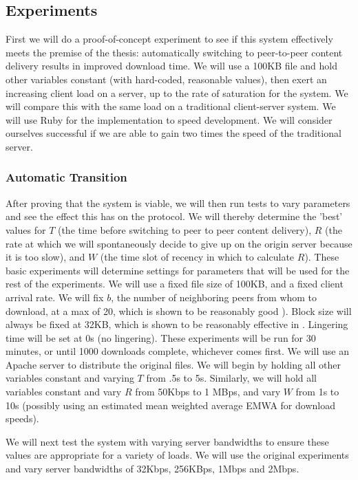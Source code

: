 \subsection{Experiments}
First we will do a proof-of-concept experiment to see if this system effectively meets the premise of the thesis: automatically switching to peer-to-peer content delivery results in improved download time.  We will use a 100KB file and hold other variables constant (with hard-coded, reasonable values), then exert an increasing client load on a server, up to the rate of saturation for the system.  We will compare this with the same load on a traditional client-server system.   We will use Ruby for the implementation to speed development.  We will consider ourselves successful if we are able to gain two times the speed of the traditional server. %

\subsubsection{Automatic Transition}
After proving that the system is viable, we will then run tests to vary parameters and see the effect this has on the protocol.  We will thereby determine the 'best' values for $T$ (the time before switching to peer to peer content delivery), $R$ (the rate at which we will spontaneously decide to give up on the origin server because it is too slow), and $W$ (the time slot of recency in which to calculate $R$).  These basic experiments will determine settings for parameters that will be used for the rest of the experiments.  We will use a fixed file size of 100KB, and a fixed client arrival rate.  We will fix $b$, the number of neighboring peers from whom to download, at a max of 20, which is shown to be reasonably good \cite{bharambe}).  Block size will always be fixed at 32KB, which is shown to be reasonably effective in \cite{zappala}.  Lingering time will be set at 0s (no lingering).  These experiments will be run for 30 minutes, or until 1000 downloads complete, whichever comes first.  We will use an Apache server to distribute the original files.  We will begin by holding all other variables constant and varying $T$ from .5s to 5s.  Similarly, we will hold all variables constant and vary $R$ from 50Kbps to 1 MBps, and  vary $W$ from 1s to 10s (possibly using an estimated mean weighted average EMWA for download speeds). 

We will next test the system with varying server bandwidths to ensure these values are appropriate for a variety of loads.  We will use the original experiments and vary server bandwidths of 32Kbps, 256KBps, 1Mbps and 2Mbps. 
